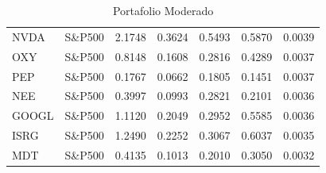 \begin{table}[htbp]
\begin{tabular}{lrrrrrr}
NVDA & S\&P500 & 2.1748 & 0.3624 & 0.5493 & 0.5870 & 0.0039 \\
OXY & S\&P500 & 0.8148 & 0.1608 & 0.2816 & 0.4289 & 0.0037 \\
PEP & S\&P500 & 0.1767 & 0.0662 & 0.1805 & 0.1451 & 0.0037 \\
NEE & S\&P500 & 0.3997 & 0.0993 & 0.2821 & 0.2101 & 0.0036 \\
GOOGL & S\&P500 & 1.1120 & 0.2049 & 0.2952 & 0.5585 & 0.0036 \\
ISRG & S\&P500 & 1.2490 & 0.2252 & 0.3067 & 0.6037 & 0.0035 \\
MDT & S\&P500 & 0.4135 & 0.1013 & 0.2010 & 0.3050 & 0.0032 \\
\hline
\end{tabular}
\caption{Portafolio Moderado}
\label{tab:portafolio-moderate}
\end{table}
